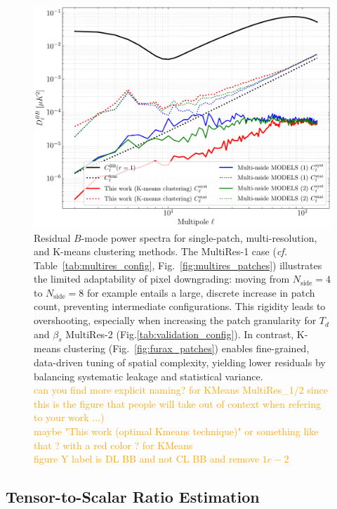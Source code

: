 \documentclass[fleqn,usenatbib]{mnras}
\newcommand{\je}[1]{\textcolor{orange}{#1}}
\begin{document}
\begin{figure}
    \centering
    \includegraphics[width=\linewidth]{figures/bb_residual_spectra.pdf}
    \caption{
    Residual \( B \)-mode power spectra for single-patch, multi-resolution, and K-means clustering methods. 
    The MultiRes-1 case (\textit{cf.} Table~\ref{tab:multires_config}, Fig.~\ref{fig:multires_patches}) illustrates the limited adaptability of pixel downgrading: moving from \(N_{\mathrm{side}} = 4\) to \(N_{\mathrm{side}} = 8\) for example entails a large, discrete increase in patch count, preventing intermediate configurations. 
    This rigidity leads to overshooting, especially when increasing the patch granularity for \(T_d\) and \(\beta_s\) MultiRes-2 (Fig.\ref{tab:validation_config}).
    In contrast, K-means clustering (Fig.~\ref{fig:furax_patches}) enables fine-grained, data-driven tuning of spatial complexity, yielding lower residuals by balancing systematic leakage and statistical variance.\\
    \je{can you find more explicit naming? for KMeans MultiRes\_1/2 since this is the figure that people will take out of context when refering to your work ...)}\\
    \je{maybe "This work (optimal Kmeans technique)" or something like that ?  with a red color ? for KMeans}\\
    \je{figure Y label is DL BB and not CL BB and remove $1e-2$}
    }
    \label{fig:bb_spectra_comparison}
\end{figure}

\subsection{Tensor-to-Scalar Ratio Estimation}
\label{subsec:r_estimation}
\end{document}
